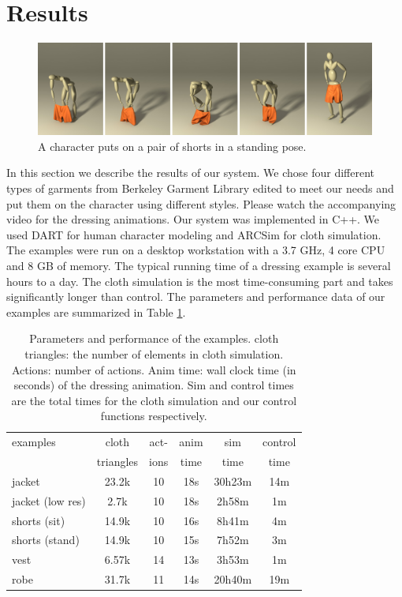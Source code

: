 \section{Results}



\begin{figure}[!t]
  \centering
  \includegraphics[width=\textwidth]{images/shortsStanding}
  \caption{A character puts on a pair of shorts in a standing pose.}
  \label{fig:shorts2}
\end{figure}
In this section we describe the results of our system. We chose four different types of garments from Berkeley Garment Library edited to meet our needs and put them on the character using different styles. Please watch the accompanying video for the dressing animations. Our system was implemented in C++. We used DART \cite{Liu:2012:STM} for human character modeling and ARCSim \cite{Narain:2012:AAR} for cloth simulation. The examples were run on a desktop workstation with a 3.7 GHz, 4 core CPU and 8 GB of memory. The typical running time of a dressing example is several hours to a day. The cloth simulation is the most time-consuming part and takes significantly longer than control. The parameters and performance data of our examples are summarized in Table
 \ref{table:data}. 

\begin{table}
  \centering
  \begin{tabular}{|l|c|c|c|c|c|}
    \hline
    examples 		& cloth 	& act- 	& anim	& sim 		& control \\
                    & triangles & 	ions& time 	& time 		& time \\
    \hline
    jacket 			& 23.2k  	& 10	& 18s 	& 30h23m	&  14m  \\
    jacket (low res)& 2.7k		& 10	& 18s	& 2h58m		& 1m \\
    shorts (sit) 	& 14.9k 	& 10	& 16s 	&  8h41m 	& 4m \\
    shorts (stand)	& 14.9k 	& 10	& 15s	&  7h52m	& 3m \\
    vest 			& 6.57k		& 14	& 13s	&  3h53m	& 1m   \\
    robe 			& 31.7k 	& 11	& 14s	& 20h40m	& 19m  \\
    \hline
  \end{tabular}
  \caption{Parameters and performance of the examples. cloth triangles: the number of elements in cloth simulation. Actions: number of actions. Anim time: wall clock time (in seconds) of the dressing animation. Sim and control times are the total times for the cloth simulation and our control functions respectively.}
  \label{table:data}
\end{table}

